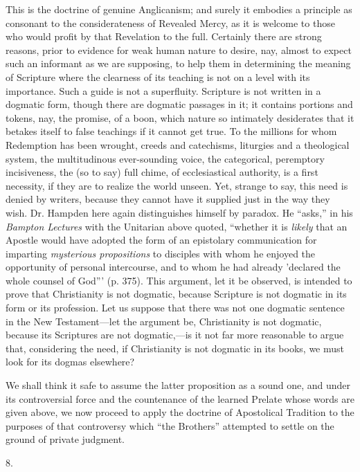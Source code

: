This is the doctrine of genuine Anglicanism; and
surely it embodies a principle as consonant to the considerateness of
Revealed Mercy, as it is welcome to those who would profit by that
Revelation to the full. Certainly there are strong reasons, prior to
evidence for weak human nature to desire, nay, almost to expect
such an informant as we are supposing, to help them in determining the
meaning of Scripture where the clearness of its teaching is not on a
level with its importance. Such a guide is not a superfluity.
Scripture is not written in a dogmatic form, though there are dogmatic
passages in it; it contains portions and tokens, nay, the promise, of
a boon, which nature so intimately desiderates that it betakes itself
to false teachings if it cannot get true. To the millions for whom
Redemption has been wrought, creeds and catechisms, liturgies and a
theological system, the multitudinous ever-sounding voice, the
categorical, peremptory incisiveness, the (so to say) full chime, of
ecclesiastical authority, is a first necessity, if they are to realize
the world unseen. Yet, strange to say, this need is denied by writers,
because they cannot have it supplied just in the way they wish. Dr.
Hampden here again distinguishes himself by paradox. He ``asks,'' in his
\emph{Bampton Lectures} with the Unitarian above quoted, ``whether it
is \emph{likely} that an Apostle would have adopted the form of an
epistolary communication for imparting \emph{mysterious propositions}
to disciples with whom he enjoyed the opportunity of personal
intercourse, and to whom he had already 'declared the whole counsel of
God''' (p. 375). This argument, let it be observed, is intended to
prove that Christianity is not dogmatic, because Scripture is not
dogmatic in its form or its profession. Let us suppose that there was
not one dogmatic sentence in the New Testament—let the argument be,
Christianity is not dogmatic, because its Scriptures are not
dogmatic,—is it not far more reasonable to argue that, considering
the need, if Christianity is not dogmatic in its books, we must look
for its dogmas elsewhere?

We shall think it safe to assume the latter
proposition as a sound one, and under its controversial force and the
countenance of the learned Prelate whose words are given above, we now
proceed to apply the doctrine of Apostolical Tradition to the purposes
of that controversy which ``the Brothers'' attempted to settle on the
ground of private judgment.

8.

